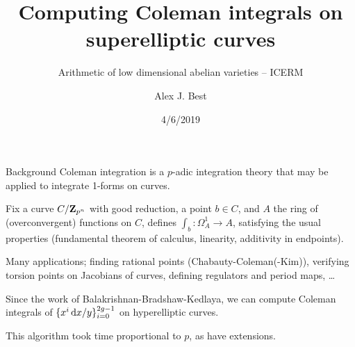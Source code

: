 \newcommand{\sheaf}[1]{\operatorname{\mathcal{#1}}}
\newcommand{\inv}{^{-1}}
\DeclareMathOperator{\norm}{Nm}
\DeclareMathOperator{\ord}{ord}
\DeclareMathOperator{\divisor}{div}
\DeclareMathOperator{\PP}{\mathbf{P}}
\DeclareMathOperator{\Hom}{Hom}
\DeclareMathOperator{\Mat}{Mat}
\DeclareMathOperator{\End}{End}

\newcommand{\lb}{[}
\newcommand{\rb}{]}


\author{Alex J. Best}
\date{4/6/2019}
\title{Computing Coleman integrals on superelliptic curves}
\subtitle{Arithmetic of low dimensional abelian varieties -- ICERM}



\begin{frame}
  \titlepage

\end{frame}



\begin{frame}{Background}
    \alert{Coleman integration} is a $p$-adic integration theory that may be applied to integrate 1-forms on curves.

    \pause%
    Fix a curve $C/\mathbf{Z}_{p^n}$ with good reduction, a point $b\in C$, and $A$ the ring of (overconvergent) functions on $C$, defines $\int_b\colon \Omega^{1}_{A} \to A$,
    satisfying the usual properties (fundamental theorem of calculus, linearity, additivity in endpoints).

    \pause Many applications; finding rational points (Chabauty-Coleman(-Kim)), verifying torsion points on Jacobians of curves, defining regulators and period maps, \ldots


    \pause Since the work of Balakrishnan-Bradshaw-Kedlaya, we can compute Coleman integrals of $\{x^i\mathop{}\!\mathrm{d} x/y\}_{i=0}^{2g-1}$ on hyperelliptic curves.

    \pause This algorithm took time proportional to $p$, as have extensions.

\end{frame}

